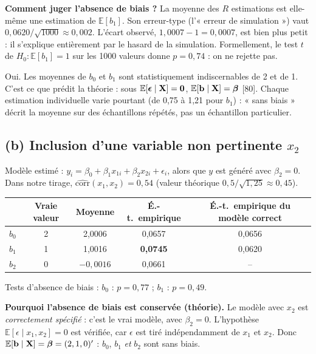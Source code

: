 \documentclass[11pt,a4paper]{article}
\newcommand{\vbeta}{\bm{\beta}}\newcommand{\veps}{\bm{\epsilon}}\newcommand{\valpha}{\bm{\alpha}}
\newcommand{\E}{\mathbb{E}}\newcommand{\Var}{\operatorname{Var}}\newcommand{\Cov}{\operatorname{Cov}}
\begin{document}
\textbf{Comment juger l'absence de biais ?} La moyenne des $R$ estimations est elle-même une estimation de $\E[b_1]$. Son erreur-type (l'« erreur de simulation ») vaut $0{,}0620/\sqrt{1000}\approx0{,}002$. L'écart observé, $1{,}0007-1=0{,}0007$, est bien plus petit : il s'explique entièrement par le hasard de la simulation. Formellement, le test $t$ de $H_0:\E[b_1]=1$ sur les 1000 valeurs donne $p=0{,}74$ : on ne rejette pas.

\begin{reponse}
Oui. Les moyennes de $b_0$ et $b_1$ sont statistiquement indiscernables de 2 et de 1. C'est ce que prédit la théorie : sous $\E[\veps\mid\vX]=\mathbf 0$, $\E[\vb\mid\vX]=\vbeta$ [80]. Chaque estimation individuelle varie pourtant (de 0,75 à 1,21 pour $b_1$) : « sans biais » décrit la moyenne sur des échantillons répétés, pas un échantillon particulier.
\end{reponse}

\subsection{(b) Inclusion d'une variable non pertinente $x_2$}

Modèle estimé : $y_i=\beta_0+\beta_1x_{1i}+\beta_2x_{2i}+\epsilon_i$, alors que $y$ est généré avec $\beta_2=0$. Dans notre tirage, $\widehat{\text{corr}}(x_1,x_2)=0{,}54$ (valeur théorique $0{,}5/\sqrt{1{,}25}\approx0{,}45$).

\begin{center}
\begin{tabular}{@{}lcccc@{}}
\toprule
& Vraie valeur & Moyenne & É.-t.\ empirique & É.-t.\ empirique du modèle correct \\
\midrule
$b_0$ & 2 & 2,0006 & 0,0657 & 0,0656 \\
$b_1$ & 1 & 1,0016 & \textbf{0,0745} & 0,0620 \\
$b_2$ & 0 & $-0{,}0016$ & 0,0661 & -- \\
\bottomrule
\end{tabular}
\end{center}
Tests d'absence de biais : $b_0$ : $p=0{,}77$ ; $b_1$ : $p=0{,}49$.

\textbf{Pourquoi l'absence de biais est conservée (théorie).} Le modèle avec $x_2$ est \emph{correctement spécifié} : c'est le vrai modèle, avec $\beta_2=0$. L'hypothèse $\E[\epsilon\mid x_1,x_2]=0$ est vérifiée, car $\epsilon$ est tiré indépendamment de $x_1$ et $x_2$. Donc $\E[\vb\mid\vX]=\vbeta=(2,1,0)'$ : $b_0$, $b_1$ \emph{et} $b_2$ sont sans biais.
\end{document}
